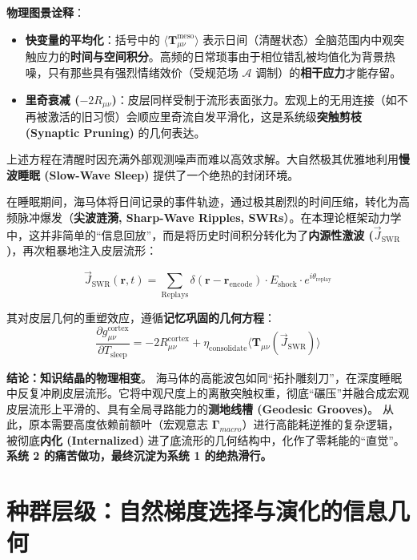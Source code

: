 \textbf{物理图景诠释}：
\begin{itemize}
    \item \textbf{快变量的平均化}：括号中的 $\langle \mathbf{T}_{\mu\nu}^{\text{meso}} \rangle$ 表示日间（清醒状态）全脑范围内中观突触应力的\textbf{时间与空间积分}。高频的日常琐事由于相位错乱被均值化为背景热噪，只有那些具有强烈情绪效价（受规范场 $\mathcal{A}$ 调制）的\textbf{相干应力}才能存留。
    \item \textbf{里奇衰减 ($-2R_{\mu\nu}$)}：皮层同样受制于流形表面张力。宏观上的无用连接（如不再被激活的旧习惯）会顺应里奇流自发平滑化，这是系统级\textbf{突触剪枝 (Synaptic Pruning)} 的几何表达。
\end{itemize}


上述方程在清醒时因充满外部观测噪声而难以高效求解。大自然极其优雅地利用\textbf{慢波睡眠 (Slow-Wave Sleep)} 提供了一个绝热的封闭环境。

在睡眠期间，海马体将日间记录的事件轨迹，通过极其剧烈的时间压缩，转化为高频脉冲爆发（\textbf{尖波涟漪, Sharp-Wave Ripples, SWRs}）。在本理论框架动力学中，这并非简单的“信息回放”，而是将历史时间积分转化为了\textbf{内源性激波 ($\vec{J}_{\text{SWR}}$)}，再次粗暴地注入皮层流形：

\begin{definition}[重入激波方程]
    $$ \vec{J}_{\text{SWR}}(\mathbf{r}, t) = \sum_{\text{Replays}} \delta(\mathbf{r} - \mathbf{r}_{\text{encode}}) \cdot E_{\text{shock}} \cdot e^{i\theta_{\text{replay}}} $$
\end{definition}

其对皮层几何的重塑效应，遵循\textbf{记忆巩固的几何方程}：
\begin{equation}
    \boxed{ \frac{\partial g_{\mu\nu}^{\text{cortex}}}{\partial T_{\text{sleep}}} = -2 R_{\mu\nu}^{\text{cortex}} + \eta_{\text{consolidate}} \langle \mathbf{T}_{\mu\nu}(\vec{J}_{\text{SWR}}) \rangle }
\end{equation}

\textbf{结论：知识结晶的物理相变}。
海马体的高能波包如同“拓扑雕刻刀”，在深度睡眠中反复冲刷皮层流形。它将中观尺度上的离散突触权重，彻底“碾压”并融合成宏观皮层流形上平滑的、具有全局寻路能力的\textbf{测地线槽 (Geodesic Grooves)}。
从此，原本需要高度依赖前额叶（宏观意志 $\mathbf{\Gamma}_{macro}$）进行高能耗逆推的复杂逻辑，被彻底\textbf{内化 (Internalized)} 进了底流形的几何结构中，化作了零耗能的“直觉”。\textbf{系统 2 的痛苦做功，最终沉淀为系统 1 的绝热滑行。}


\section{种群层级：自然梯度选择与演化的信息几何}
\label{sec:population_evolution_information_geometry}


